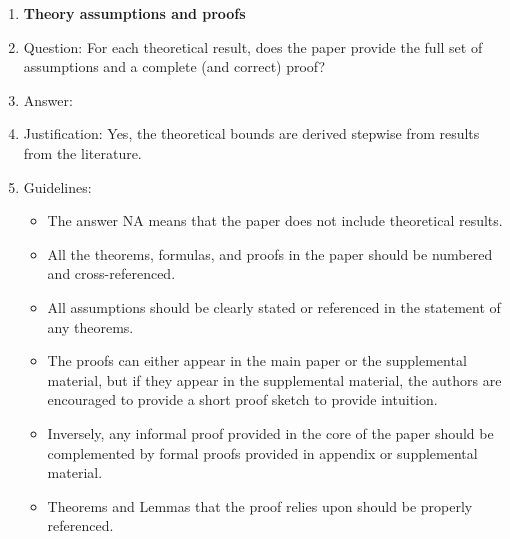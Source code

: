 \documentclass{article}
\theoremstyle{definition} \newtheorem{definition}{Definition}  \newtheorem{example}{Example}
\theoremstyle{remark} \newtheorem{remark}{Remark}
\newcounter{ct}
\begin{document}
\begin{enumerate}
\item {\bf Theory assumptions and proofs}
    \item[] Question: For each theoretical result, does the paper provide the full set of assumptions and a complete (and correct) proof?
    \item[] Answer: \answerYes{} %
    \item[] Justification: Yes, the theoretical bounds are derived stepwise from results from the literature.
    \item[] Guidelines:
    \begin{itemize}
        \item The answer NA means that the paper does not include theoretical results. 
        \item All the theorems, formulas, and proofs in the paper should be numbered and cross-referenced.
        \item All assumptions should be clearly stated or referenced in the statement of any theorems.
        \item The proofs can either appear in the main paper or the supplemental material, but if they appear in the supplemental material, the authors are encouraged to provide a short proof sketch to provide intuition. 
        \item Inversely, any informal proof provided in the core of the paper should be complemented by formal proofs provided in appendix or supplemental material.
        \item Theorems and Lemmas that the proof relies upon should be properly referenced. 
    \end{itemize}


\end{enumerate}
\end{document}
